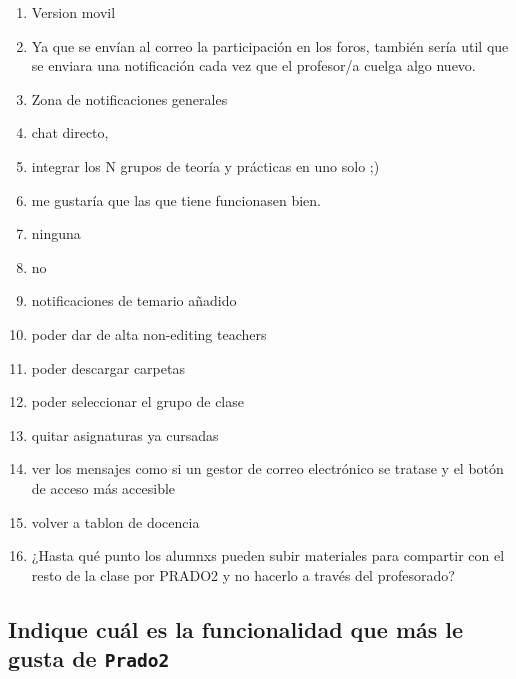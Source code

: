 \begin{enumerate}
\item Version movil
\item Ya que se envían al correo la participación en los foros, también sería util que se enviara una notificación cada vez que el profesor/a cuelga algo nuevo.
\item Zona de notificaciones generales
\item chat directo,
\item integrar los N grupos de teoría y prácticas en uno solo ;)
\item me gustaría que las que tiene funcionasen bien.
\item ninguna
\item no
\item notificaciones de temario añadido
\item poder dar de alta non-editing teachers
\item poder descargar carpetas
\item poder seleccionar el grupo de clase
\item quitar asignaturas ya cursadas
\item ver los mensajes como si un gestor de correo electrónico se tratase y el botón de acceso más accesible
\item volver a tablon de docencia
\item ¿Hasta qué punto los alumnxs pueden subir materiales para compartir con el resto de la clase por PRADO2 y no hacerlo a través del profesorado?
\end{enumerate}

\subsection{Indique cuál es la funcionalidad que más le gusta de \texttt{Prado2}}

